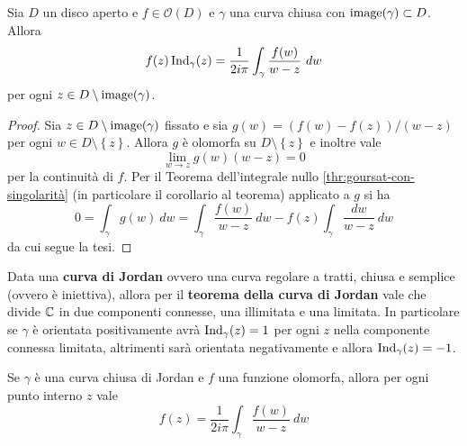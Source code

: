 \begin{theorem}
    Sia $D$ un disco aperto e $f \in \mathcal{O}(D)$ e $\gamma$ una curva
    chiusa con $\operatorname{image}(\gamma) \subset D$. Allora
    \begin{equation*}
        f(z) \operatorname{Ind}_\gamma(z) = \frac{1}{2i\pi} \int_\gamma
        \frac{f(w)}{w-z} \ dw
    \end{equation*}
    per ogni $z \in D \setminus \operatorname{image}(\gamma)$.
    \label{thr:formula-integrale-cauchy}
\end{theorem}
\begin{proof}
  Sia $z \in D \setminus \operatorname{image}(\gamma)$ fissato e sia $g(w) = (f(w) - f(z))
  / (w-z)$ per ogni $w \in D \setminus \left\{ z \right\}$. 
  Allora $g$ è olomorfa su $D \setminus \left\{ z \right\}$ e inoltre vale
  \begin{equation*}
    \lim_{w \to z} g(w) (w-z) = 0
  \end{equation*}
  per la continuità di $f$. Per il Teorema dell'integrale nullo
  \ref{thr:goursat-con-singolarità} (in particolare il corollario 
  al teorema) applicato a $g$ si ha
  \begin{equation*}
    0  = \int_\gamma g(w)\ dw = \int_\gamma \frac{f(w)}{w-z}\ dw
    - f(z)\int_\gamma \frac{dw}{w-z}\ dw 
  \end{equation*}
  da cui segue la tesi.
\end{proof} 

\begin{remark}
  Data una \textbf{curva di Jordan} ovvero una curva regolare a tratti,
  chiusa e semplice (ovvero è iniettiva), allora per il \textbf{teorema
  della curva di Jordan} vale che divide $\mathbb{C}$ in due componenti connesse, 
  una illimitata e una limitata. In particolare se $\gamma$ è orientata 
  positivamente avrà $\operatorname{Ind}_\gamma(z) = 1$ per ogni $z$ nella
  componente connessa limitata, altrimenti sarà orientata negativamente
  e allora $\operatorname{Ind}_\gamma(z) = -1$.
    \label{rmk:teorema-curva-di-jordan}
\end{remark}

\begin{corollary}
    Se $\gamma$ è una curva chiusa di Jordan e $f$ una funzione olomorfa, allora
    per ogni punto interno $z$ vale 
    \begin{equation*}
        f(z) = \frac{1}{2i\pi} \int_\gamma\frac{f(w)}{w-z}\ dw
    \end{equation*}
    \label{cor:curva-jordan-integral-calculation}
\end{corollary}

